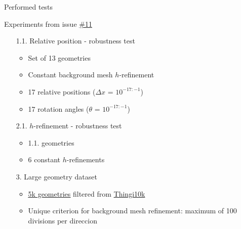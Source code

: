 \documentclass{beamer}
\title{}
\subtitle{STLCutter.jl}
\date{\today}
\author{Pere Antoni Martorell}
\institute{\url{http://github.com/pmartorell/STLCutters.jl}}
\begin{document}
\maketitle
\begin{frame}{Performed tests}

  Experiments from issue
  \href{https://github.com/pmartorell/STLCutters.jl/issues/11}{\#11}

  \vfill{}

  \begin{itemize}
    \item[1.1.] 
      Relative position - robustness test
      \begin{itemize}
        \item
          Set of 13 geometries
        \item
          Constant background mesh $h$-refinement%
        \item
          17 relative positions ($\Delta x$ = $10^{-17:-1}$)
        \item
          17 rotation angles ($\theta$ = $10^{-17:-1}$)
      \end{itemize}
    \item[2.1.]
      $h$-refinement - robustness test
      \begin{itemize}
        \item
          1.1. geometries
        \item
          6 constant $h$-refinements
      \end{itemize}
    \item[3.] Large geometry dataset
      \begin{itemize}
        \item   
          \href{https://ten-thousand-models.appspot.com/results.html?q=is+closed\%2C+is+oriented\%2C+is+manifold\%2C+is+not+degenerate\%2C+without+self-intersection\%2C+\%23df\%3D0}{\underline{5k geometries}}
          filtered from \href{https://ten-thousand-models.appspot.com}{Thingi10k}
        \item
          Unique criterion for background mesh refinement: maximum of 100 divisions per direccion
      \end{itemize}
  \end{itemize}
%
%

\end{frame}
\end{document}
